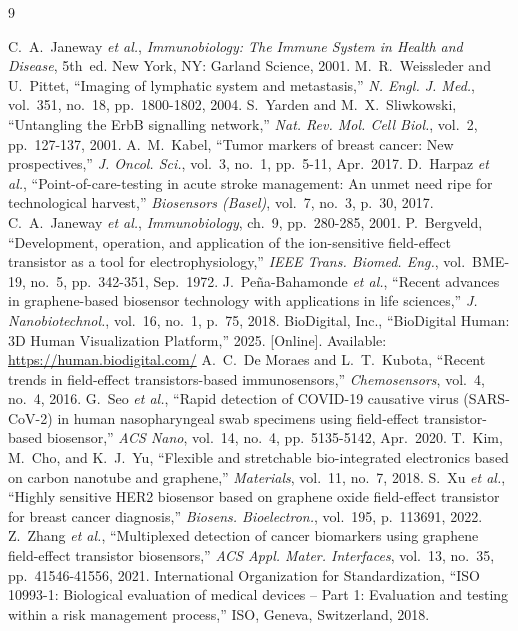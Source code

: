 \documentclass[12pt,a4paper]{report}
\begin{document}
\begin{thebibliography}{9}
 C.~A.~Janeway \textit{et al.}, \textit{Immunobiology: The Immune System in Health and Disease}, 5th~ed. New York, NY: Garland Science, 2001.
 M.~R.~Weissleder and U.~Pittet, ``Imaging of lymphatic system and metastasis,'' \textit{N. Engl. J. Med.}, vol.~351, no.~18, pp.~1800-1802, 2004.
 S.~Yarden and M.~X.~Sliwkowski, ``Untangling the ErbB signalling network,'' \textit{Nat. Rev. Mol. Cell Biol.}, vol.~2, pp.~127-137, 2001.
 A.~M.~Kabel, ``Tumor markers of breast cancer: New prospectives,'' \textit{J. Oncol. Sci.}, vol.~3, no.~1, pp.~5-11, Apr.~2017.
 D.~Harpaz \textit{et al.}, ``Point-of-care-testing in acute stroke management: An unmet need ripe for technological harvest,'' \textit{Biosensors (Basel)}, vol.~7, no.~3, p.~30, 2017.
 C.~A.~Janeway \textit{et al.}, \textit{Immunobiology}, ch.~9, pp.~280-285, 2001.
 P.~Bergveld, ``Development, operation, and application of the ion-sensitive field-effect transistor as a tool for electrophysiology,'' \textit{IEEE Trans. Biomed. Eng.}, vol.~BME-19, no.~5, pp.~342-351, Sep.~1972.
 J.~Peña-Bahamonde \textit{et al.}, ``Recent advances in graphene-based biosensor technology with applications in life sciences,'' \textit{J. Nanobiotechnol.}, vol.~16, no.~1, p.~75, 2018.
BioDigital, Inc., ``BioDigital Human: 3D Human Visualization Platform,'' 2025. [Online]. Available: \url{https://human.biodigital.com/}
 A.~C.~De Moraes and L.~T.~Kubota, ``Recent trends in field-effect transistors-based immunosensors,'' \textit{Chemosensors}, vol.~4, no.~4, 2016.
 G.~Seo \textit{et al.}, ``Rapid detection of COVID-19 causative virus (SARS-CoV-2) in human nasopharyngeal swab specimens using field-effect transistor-based biosensor,'' \textit{ACS Nano}, vol.~14, no.~4, pp.~5135-5142, Apr.~2020.
 T.~Kim, M.~Cho, and K.~J.~Yu, ``Flexible and stretchable bio-integrated electronics based on carbon nanotube and graphene,'' \textit{Materials}, vol.~11, no.~7, 2018.
 S.~Xu \textit{et al.}, ``Highly sensitive HER2 biosensor based on graphene oxide field-effect transistor for breast cancer diagnosis,'' \textit{Biosens. Bioelectron.}, vol.~195, p.~113691, 2022.
 Z.~Zhang \textit{et al.}, ``Multiplexed detection of cancer biomarkers using graphene field-effect transistor biosensors,'' \textit{ACS Appl. Mater. Interfaces}, vol.~13, no.~35, pp.~41546-41556, 2021.
International Organization for Standardization, ``ISO 10993-1: Biological evaluation of medical devices – Part 1: Evaluation and testing within a risk management process,'' ISO, Geneva, Switzerland, 2018.

\end{thebibliography}
\end{document}
